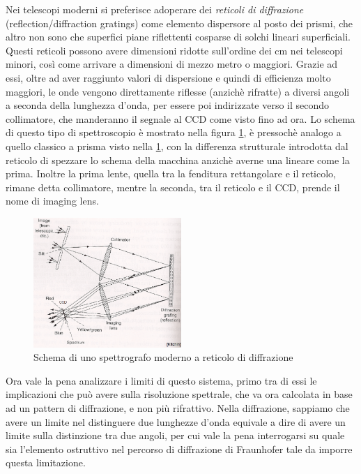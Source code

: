 Nei telescopi moderni si preferisce adoperare dei \textit{reticoli di diffrazione} (reflection/diffraction gratings) come elemento dispersore al posto dei prismi, che altro non sono che superfici piane riflettenti cosparse di solchi lineari superficiali. Questi reticoli possono avere dimensioni ridotte sull'ordine dei cm nei telescopi minori, così come arrivare a dimensioni di mezzo metro o maggiori. Grazie ad essi, oltre ad aver raggiunto valori di dispersione e quindi di efficienza molto maggiori, le onde vengono direttamente riflesse (anzichè rifratte) a diversi angoli a seconda della lunghezza d'onda, per essere poi indirizzate verso il secondo collimatore, che manderanno il segnale al CCD come visto fino ad ora. Lo schema di questo tipo di spettroscopio è mostrato nella figura \ref{im:schema-spettroscopio-reticolo}, è pressochè analogo a quello classico a prisma visto nella \ref{im:schema-spettroscopio-reticolo}, con la differenza strutturale introdotta dal reticolo di spezzare lo schema della macchina anzichè averne una lineare come la prima. Inoltre la prima lente, quella tra la fenditura rettangolare e il reticolo, rimane detta collimatore, mentre la seconda, tra il reticolo e il CCD, prende il nome di imaging lens.

\begin{figure}[h]
    \centering
    \includegraphics[width=0.5\textwidth]{Immagini/Capitolo3/Spettrografo_schema_reticolo_diff.PNG}
    \caption{Schema di uno spettrografo moderno a reticolo di diffrazione}
    \label{im:schema-spettroscopio-reticolo}
\end{figure}

Ora vale la pena analizzare i limiti di questo sistema, primo tra di essi le implicazioni che può avere sulla risoluzione spettrale, che va ora calcolata in base ad un pattern di diffrazione, e non più rifrattivo. Nella diffrazione, sappiamo che avere un limite nel distinguere due lunghezze d'onda equivale a dire di avere un limite sulla distinzione tra due angoli, per cui vale la pena interrogarsi su quale sia l'elemento ostruttivo nel percorso di diffrazione di Fraunhofer tale da imporre questa limitazione.

